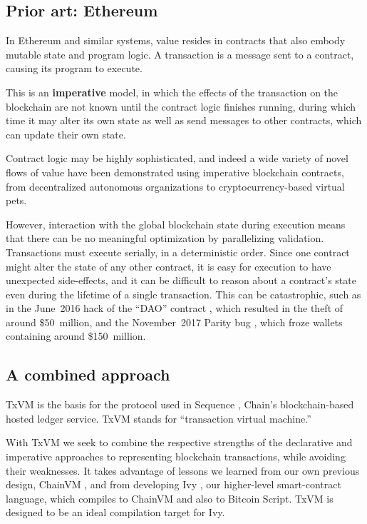 \documentclass{article}
\newcommand{\txvm}{TxVM}
\begin{document}
\subsection{Prior art: Ethereum}

In Ethereum \cite{wood2014ethereum} and similar systems, value resides
in contracts that also embody mutable state and program logic. A
transaction is a message sent to a contract, causing its program to
execute.

This is an \textbf{imperative} model, in which the effects of the transaction on the blockchain are not known until the contract logic finishes running, during which time it may alter its own state as well as send messages to other contracts, which can update their own state.

Contract logic may be highly sophisticated, and indeed a wide variety of novel flows of value have been demonstrated using imperative blockchain contracts, from decentralized autonomous organizations to cryptocurrency-based virtual pets.

However, interaction with the global blockchain state during execution
means that there can be no meaningful optimization by parallelizing
validation. Transactions must execute serially, in a deterministic
order. Since one contract might alter the state of any other contract,
it is easy for execution to have unexpected side-effects, and it can
be difficult to reason about a contract's state even during the
lifetime of a single transaction. This can be catastrophic, such as in
the June~2016 hack of the ``DAO'' contract \cite{dao}, which resulted
in the theft of around \$50~million, and the November~2017 Parity bug
\cite{parity}, which froze wallets containing around \$150~million.

\subsection{A combined approach}

\txvm{} is the basis for the protocol used in Sequence
\cite{sequence}, Chain's blockchain-based hosted ledger
service. \txvm{} stands for ``transaction virtual machine.''

With \txvm{} we seek to combine the respective strengths of the
declarative and imperative approaches to representing blockchain
transactions, while avoiding their weaknesses. It takes advantage of
lessons we learned from our own previous design, ChainVM
\cite{chainvm}, and from developing Ivy \cite{ivy}, our higher-level
smart-contract language, which compiles to ChainVM and also to Bitcoin
Script. \txvm{} is designed to be an ideal compilation target for Ivy.
\end{document}
